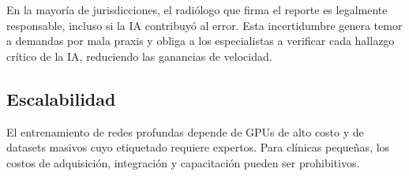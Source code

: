 En la mayoría de jurisdicciones, el radiólogo que firma el reporte es legalmente responsable, incluso si la IA contribuyó al error. Esta incertidumbre genera temor a demandas por mala praxis y obliga a los especialistas a verificar cada hallazgo crítico de la IA, reduciendo las ganancias de velocidad.

\subsection{Escalabilidad}

El entrenamiento de redes profundas depende de GPUs de alto costo y de datasets masivos cuyo etiquetado requiere expertos. Para clínicas pequeñas, los costos de adquisición, integración y capacitación pueden ser prohibitivos.
